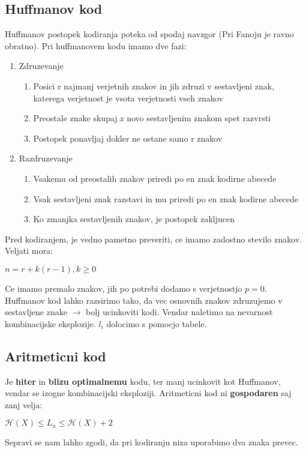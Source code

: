 \documentclass{article}
\begin{document}
\begin{multicols}{2}
	\subsection{Huffmanov kod}
	Huffmanov postopek kodiranja poteka od spodaj navzgor (Pri Fanoju je ravno obratno).
	Pri huffmanovem kodu imamo dve fazi:
	\begin{enumerate}
		\item Zdruzevanje
		      \begin{enumerate}
			      \item Posici r najmanj verjetnih znakov in jih zdruzi v sestavljeni znak, katerega verjetnost je vsota verjetnosti vseh znakov
			      \item Preostale znake skupaj z novo sestavljenim znakom spet razvrsti
			      \item Postopek ponavljaj dokler ne ostane samo r znakov
		      \end{enumerate}
		\item Razdruzevanje
		      \begin{enumerate}
			      \item Vsakemu od preostalih znakov priredi po en znak kodirne abecede
			      \item Vsak sestavljeni znak razstavi in mu priredi po en znak kodirne abecede
			      \item Ko zmanjka sestavljenih znakov, je postopek zakljucen
		      \end{enumerate}
	\end{enumerate}
	Pred kodiranjem, je vedno pametno preveriti, ce imamo zadostno stevilo znakov.
	Veljati mora:
	\begin{center}
		\begin{math}
			n = r + k(r-1), k \geq 0
		\end{math}
	\end{center}
	Ce imamo premalo znakov, jih po potrebi dodamo s verjetnostjo $p=0$.\\
	Huffmanov kod lahko razsirimo tako, da vec osnovnih znakov zdruzujemo v sestavljene znake $\rightarrow$ bolj ucinkoviti kodi. Vendar
	naletimo na nevarnost kombinacijske eksplozije. $l_i$ dolocimo s pomocjo tabele.

	\subsection{Aritmeticni kod}
	Je \textbf{hiter} in \textbf{blizu optimalnemu} kodu, ter manj ucinkovit kot Huffmanov,
	vendar se izogne kombinacijski  eksploziji. Aritmeticni kod ni \textbf{gospodaren} saj zanj velja:
	\begin{center}
		\begin{math}
			\mathcal{H}(X) \leq L_n \leq \mathcal{H}(X) + 2
		\end{math}
	\end{center}
	Sepravi se nam lahko zgodi, da pri kodiranju niza uporabimo dva znaka prevec.


\end{multicols}
\end{document}
